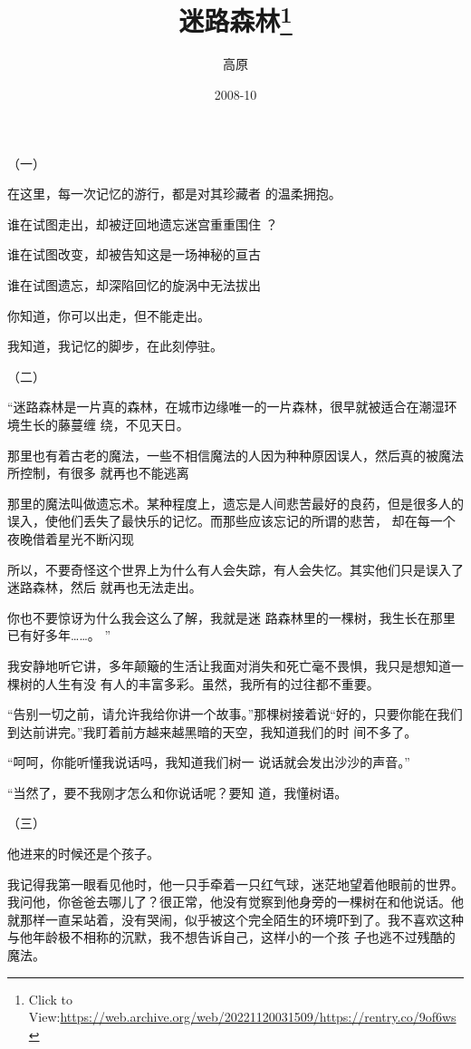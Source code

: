 \documentclass{article}
\title{迷路森林\footnote{Click to View:\url{https://web.archive.org/web/20221120031509/https://rentry.co/9of6ws}}}
\author{高原}
\date{2008-10}
\begin{document}

\maketitle


\Large


﻿（一） 

在这里，每一次记忆的游行，都是对其珍藏者
的温柔拥抱。 

谁在试图走出，却被迂回地遗忘迷宫重重围住
？ 

谁在试图改变，却被告知这是一场神秘的亘古

谁在试图遗忘，却深陷回忆的旋涡中无法拔出


你知道，你可以出走，但不能走出。 


\newpage

我知道，我记忆的脚步，在此刻停驻。 


（二） 

“迷路森林是一片真的森林，在城市边缘唯一的一片森林，很早就被适合在潮湿环境生长的藤蔓缠
绕，不见天日。 

那里也有着古老的魔法，一些不相信魔法的人因为种种原因误人，然后真的被魔法所控制，有很多
就再也不能逃离 

那里的魔法叫做遗忘术。某种程度上，遗忘是人间悲苦最好的良药，但是很多人的误入，使他们丢失了最快乐的记忆。而那些应该忘记的所谓的悲苦，
却在每一个夜晚借着星光不断闪现 

所以，不要奇怪这个世界上为什么有人会失踪，有人会失忆。其实他们只是误入了迷路森林，然后
就再也无法走出。 

你也不要惊讶为什么我会这么了解，我就是迷
\newpage
路森林里的一棵树，我生长在那里已有好多年……。
” 

我安静地听它讲，多年颠簸的生活让我面对消失和死亡毫不畏惧，我只是想知道一棵树的人生有没
有人的丰富多彩。虽然，我所有的过往都不重要。 

“告别一切之前，请允许我给你讲一个故事。”那棵树接着说“好的，只要你能在我们到达前讲完。”我盯着前方越来越黑暗的天空，我知道我们的时
间不多了。 

“呵呵，你能听懂我说话吗，我知道我们树一
说话就会发出沙沙的声音。” 

“当然了，要不我刚才怎么和你说话呢？要知
道，我懂树语。 


（三） 


\newpage

他进来的时候还是个孩子。 

我记得我第一眼看见他时，他一只手牵着一只红气球，迷茫地望着他眼前的世界。我问他，你爸爸去哪儿了？很正常，他没有觉察到他身旁的一棵树在和他说话。他就那样一直呆站着，没有哭闹，似乎被这个完全陌生的环境吓到了。我不喜欢这种与他年龄极不相称的沉默，我不想告诉自己，这样小的一个孩
子也逃不过残酷的魔法。 
\end{document}
